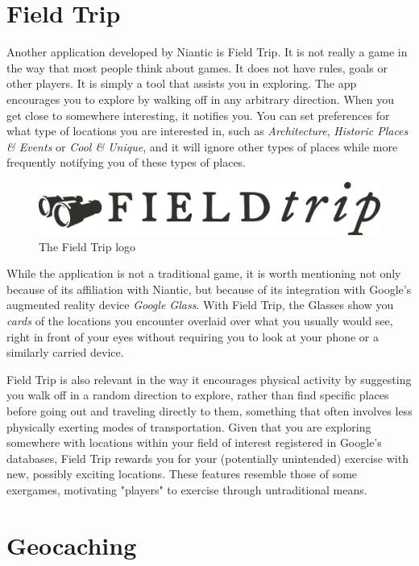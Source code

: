 \section{Field Trip}

Another application developed by Niantic is Field Trip. It is not really a game in the way that most people think about games. It does not have rules, goals or other players. It is simply a tool that assists you in exploring. The app encourages you to explore by walking off in any arbitrary direction. When you get close to somewhere interesting, it notifies you. You can set preferences for what type of locations you are interested in, such as \emph{Architecture}, \emph{Historic Places \& Events} or \emph{Cool \& Unique}, and it will ignore other types of places while more frequently notifying you of these types of places.

\begin{figure}[h]
	\centering
	\includegraphics[width=\textwidth]{Figures/fieldtrip-logo}
	\caption{The Field Trip logo}
\end{figure}

While the application is not a traditional game, it is worth mentioning not only because of its affiliation with Niantic, but because of its integration with Google's augmented reality device \emph{Google Glass}. With Field Trip, the Glasses show you \emph{cards} of the locations you encounter overlaid over what you usually would see, right in front of your eyes without requiring you to look at your phone or a similarly carried device.

Field Trip is also relevant in the way it encourages physical activity by suggesting you walk off in a random direction to explore, rather than find specific places before going out and traveling directly to them, something that often involves less physically exerting modes of transportation. Given that you are exploring somewhere with locations within your field of interest registered in Google's databases, Field Trip rewards you for your (potentially unintended) exercise with new, possibly exciting locations. These features resemble those of some exergames, motivating "players" to exercise through untraditional means.

\section{Geocaching}

